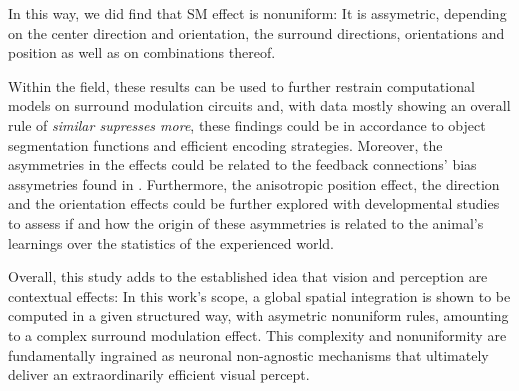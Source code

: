 
In this way, we did find that SM effect is nonuniform: It is assymetric, depending on the center direction and orientation, the surround directions, orientations and position as well as on combinations thereof. 

Within the field, these results can be used to further restrain computational models on surround modulation circuits and, with data mostly showing an overall rule of \textit{similar supresses more}, these findings could be in accordance to object segmentation functions and efficient encoding strategies. Moreover, the asymmetries in the effects could be related to the feedback connections' bias assymetries found in \cite{Marques2018}. Furthermore, the anisotropic position effect, the direction and the orientation effects could be further explored with developmental studies to assess if and how the origin of these asymmetries is related to the animal's learnings over the statistics of the experienced world.

Overall, this study adds to the established idea that vision and perception are contextual effects: In this work's scope, a global spatial integration is shown to be computed in a given structured way, with asymetric nonuniform rules, amounting to a complex surround modulation effect. This complexity and nonuniformity are fundamentally ingrained as neuronal non-agnostic mechanisms that ultimately deliver an extraordinarily efficient visual percept.


